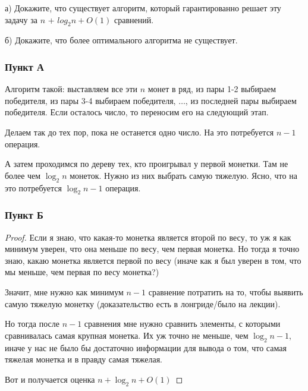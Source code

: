а) Докажите, что существует алгоритм, который гарантированно решает эту задачу
за $n$ + $log_2{n} + O(1)$ сравнений.

б) Докажите, что более оптимального алгоритма не существует.

\subsubsection{Пункт А}

Алгоритм такой: выставляем все эти $n$ монет в ряд, из пары 1-2 выбираем победителя, из пары 3-4 выбираем победителя, $\ldots$, из последней пары выбираем победителя. Если осталось число, то переносим его на следующий этап.

Делаем так до тех пор, пока не останется одно число. На это потребуется $n - 1$ операция.

А затем проходимся по дереву тех, кто проигрывал у первой монетки. Там не более чем $\log_2{n}$ монеток. Нужно из них выбрать самую тяжелую. Ясно, что на это потребуется $\log_2n - 1$ операция.

\subsubsection{Пункт Б}
\begin{proof}
Если я знаю, что какая-то монетка является второй по весу, то уж я как минимум уверен, что она меньше по весу, чем первая монетка. Но тогда я точно знаю, какаю монетка является первой по весу (иначе как я был уверен в том, что мы меньше, чем первая по весу монетка?)

Значит, мне нужно как минимум $n - 1$ сравнение потратить на то, чтобы выявить самую тяжелую монетку (доказательство есть в лонгриде/было на лекции).

Но тогда после $n - 1$ сравнения мне нужно сравнить элементы, с которыми сравнивалась самая крупная монетка. Их уж точно не меньше, чем $\log_2n - 1$, иначе у нас не было бы достаточно информации для вывода о том, что самая тяжелая монетка и в правду самая тяжелая.

Вот и получается оценка $n + \log_2n + O(1)$
\end{proof}